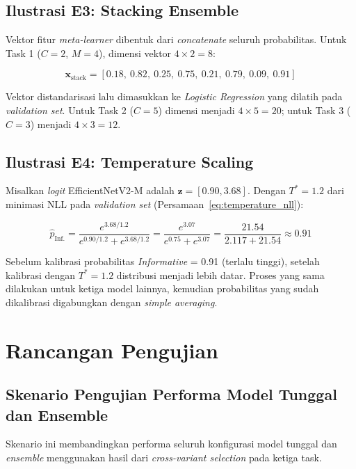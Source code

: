 \subsection{Ilustrasi E3: Stacking Ensemble}
Vektor fitur \textit{meta-learner} dibentuk dari \textit{concatenate}
seluruh probabilitas. Untuk Task 1 ($C=2$, $M=4$), dimensi vektor
$4 \times 2 = 8$:

\begin{equation}
    \mathbf{x}_{\text{stack}} =
    [0.18,\ 0.82,\ 0.25,\ 0.75,\ 0.21,\ 0.79,\ 0.09,\ 0.91]
\end{equation}

Vektor distandarisasi lalu dimasukkan ke \textit{Logistic Regression}
yang dilatih pada \textit{validation set}. Untuk Task 2 ($C=5$) dimensi
menjadi $4 \times 5 = 20$; untuk Task 3 ($C=3$) menjadi
$4 \times 3 = 12$. \par

\subsection{Ilustrasi E4: Temperature Scaling}
Misalkan \textit{logit} EfficientNetV2-M adalah $\mathbf{z} =
[0.90, 3.68]$. Dengan $T^* = 1.2$ dari minimasi NLL pada
\textit{validation set} (Persamaan~\ref{eq:temperature_nll}):

\begin{equation}
    \hat{p}_{\text{Inf.}} =
    \frac{e^{3.68/1.2}}{e^{0.90/1.2} + e^{3.68/1.2}}
    = \frac{e^{3.07}}{e^{0.75} + e^{3.07}}
    = \frac{21.54}{2.117 + 21.54} \approx 0.91
\end{equation}

Sebelum kalibrasi probabilitas \textit{Informative} = 0.91 (terlalu
tinggi), setelah kalibrasi dengan $T^*=1.2$ distribusi menjadi lebih
datar. Proses yang sama dilakukan untuk ketiga model lainnya, kemudian
probabilitas yang sudah dikalibrasi digabungkan dengan \textit{simple
averaging}. \par


\section{Rancangan Pengujian} \label{III.Rancang_Uji}

\subsection{Skenario Pengujian Performa Model Tunggal dan Ensemble}
Skenario ini membandingkan performa seluruh konfigurasi model tunggal
dan \textit{ensemble} menggunakan hasil dari \textit{cross-variant
selection} pada ketiga task. \par

